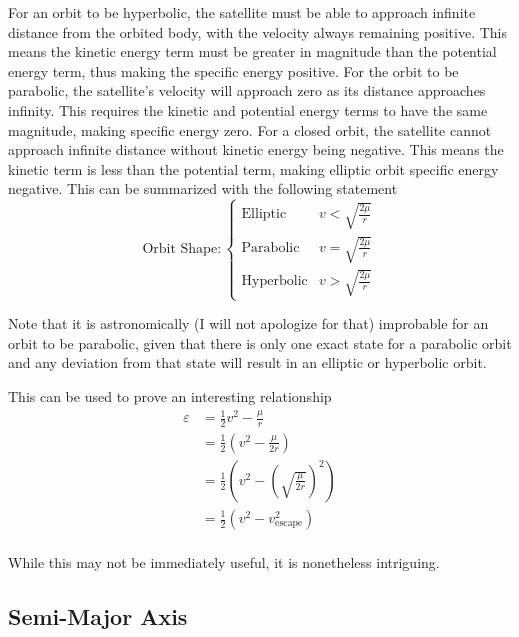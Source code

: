 \documentclass{article}
\begin{document}
For an orbit to be hyperbolic, the satellite must be able to approach infinite distance from the orbited body, with the velocity always remaining positive. This means the kinetic energy term must be greater in magnitude than the potential energy term, thus making the specific energy positive. For the orbit to be parabolic, the satellite's velocity will approach zero as its distance approaches infinity. This requires the kinetic and potential energy terms to have the same magnitude, making specific energy zero. For a closed orbit, the satellite cannot approach infinite distance without kinetic energy being negative. This means the kinetic term is less than the potential term, making elliptic orbit specific energy negative. This can be summarized with the following statement
\begin{equation}\label{Orbit Shape Physical}
    \text{Orbit Shape}: \begin{cases}
        \text{Elliptic}   & v<\sqrt{\frac{2\mu}{r}} \\
        \text{Parabolic}  & v=\sqrt{\frac{2\mu}{r}} \\
        \text{Hyperbolic} & v>\sqrt{\frac{2\mu}{r}}
    \end{cases}
\end{equation}

Note that it is astronomically (I will not apologize for that) improbable for an orbit to be parabolic, given that there is only one exact state for a parabolic orbit and any deviation from that state will result in an elliptic or hyperbolic orbit.

This can be used to prove an interesting relationship
\begin{align*}
    \varepsilon & = \frac{1}{2}v^2-\frac{\mu}{r}                                     \\
                & = \frac{1}{2}\left(v^2-\frac{\mu}{2r}\right)                       \\
                & = \frac{1}{2}\left(v^2-\left(\sqrt{\frac{\mu}{2r}}\right)^2\right) \\
                & = \frac{1}{2}\left(v^2-v_\text{escape}^2\right)                    \\
\end{align*}

While this may not be immediately useful, it is nonetheless intriguing.

\bigskip\bigskip
\subsection{Semi-Major Axis}\label{sec:SMA in Terms of V,R}
\end{document}
